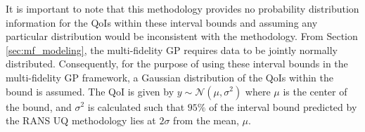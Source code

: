 It is important to note that this methodology provides no probability distribution information for the QoIs within these interval bounds and assuming any particular distribution would be inconsistent with the methodology. From Section \ref{sec:mf_modeling}, the multi-fidelity GP requires data to be jointly normally distributed. Consequently, for the purpose of using these interval bounds in the multi-fidelity GP framework, a Gaussian distribution of the QoIs within the bound is assumed. The QoI is given by $y \sim \mathcal{N}(\mu,\sigma^2)$ where $\mu$ is the center of the bound, and $\sigma^2$ is calculated such that $95\%$ of the interval bound predicted by the RANS UQ methodology lies at $2\sigma$ from the mean, $\mu$.
